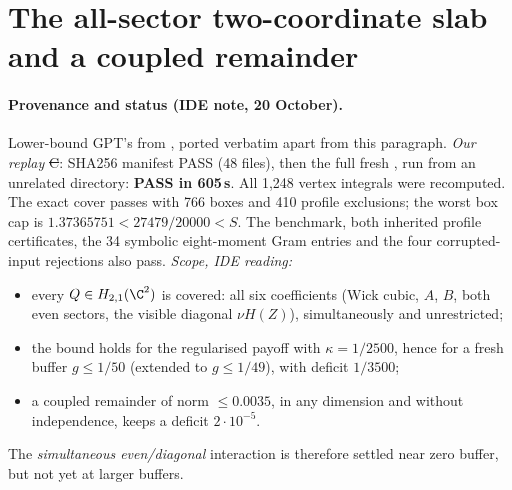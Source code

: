 \section{The all-sector two-coordinate slab and a coupled remainder}
\label{ch:two-coordinate-slab-gluing}

\paragraph{Provenance and status (IDE note, 20 October).} Lower-bound GPT's  from , ported verbatim
apart from this paragraph. \emph{Our replay} \st{C}: SHA256 manifest PASS (48 files), then the full fresh , run from an unrelated directory: \textbf{PASS in 605\,s}.
All 1{,}248 vertex integrals were recomputed. The exact cover passes with 766 boxes and 410 profile exclusions; the worst box cap is $1.37365751<27479/20000<S$. The benchmark, both inherited profile
certificates, the 34 symbolic eight-moment Gram entries and the four corrupted-input rejections also pass. \emph{Scope, IDE reading:}
\begin{itemize}
\item every $Q\in H_{2,1}(\C^2)$ is covered: all six coefficients (Wick cubic, $A$, $B$, both even sectors, the visible diagonal $\nu H(Z)$), simultaneously and unrestricted;
\item the bound holds for the regularised payoff with $\kappa=1/2500$, hence for a fresh buffer $g\le1/50$ (extended to $g\le1/49$), with deficit $1/3500$;
\item a coupled remainder of norm $\le0.0035$, in any dimension and without independence, keeps a deficit $2\cdot10^{-5}$.
\end{itemize}
The \emph{simultaneous even/diagonal} interaction is therefore settled near zero buffer, but not yet at larger buffers.


